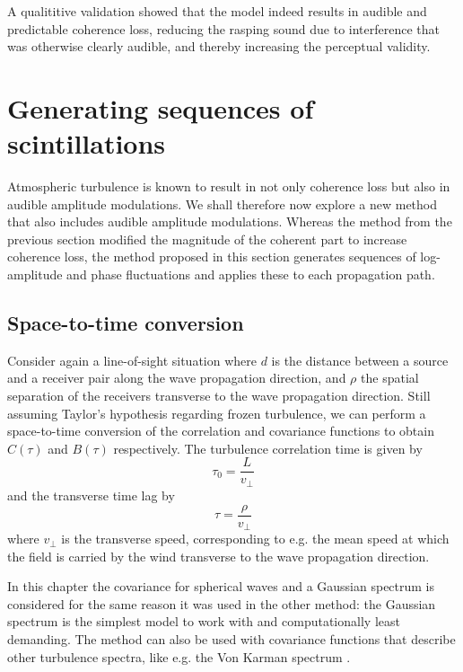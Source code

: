 A qualititive validation showed that the model indeed results in audible and
predictable coherence loss, reducing the rasping sound due to interference that
was otherwise clearly audible, and thereby increasing the perceptual validity.

\section{Generating sequences of scintillations}

Atmospheric turbulence is known to result in not only coherence loss but also in
audible amplitude modulations. We shall therefore now explore a new method that
also includes audible amplitude modulations. Whereas the method from the
previous section modified the magnitude of the coherent part to increase
coherence loss, the method proposed in this section generates sequences of
log-amplitude and phase fluctuations and applies these to each propagation path.

\subsection{Space-to-time conversion}

Consider again a line-of-sight situation where
$d$ is the distance between a source and a receiver pair along the wave
propagation direction, and $\rho$ the spatial separation of the receivers
transverse to the wave propagation direction.
Still assuming Taylor's hypothesis regarding frozen turbulence, we can perform a
space-to-time conversion of the correlation and covariance functions to obtain
$C(\tau)$ and $B(\tau)$ respectively. The turbulence correlation time is given
by
\begin{equation}
 \tau_0 = \frac{L}{v_{\bot}}
\end{equation}
and the transverse time lag by
\begin{equation}
  \tau = \frac{\rho}{v_{\bot}}
\end{equation}
where $v_{\bot}$ is the transverse speed, corresponding to e.g. the mean speed
at which the field is carried by the wind transverse to the wave propagation
direction.

In this chapter the covariance for spherical waves and a Gaussian spectrum is
considered for the same reason it was used in the other method: the Gaussian
spectrum is the simplest model to work with and computationally least demanding.
The method can also be used with covariance functions that describe other
turbulence spectra, like e.g. the Von Karman spectrum \cite{Ostashev2015}.

